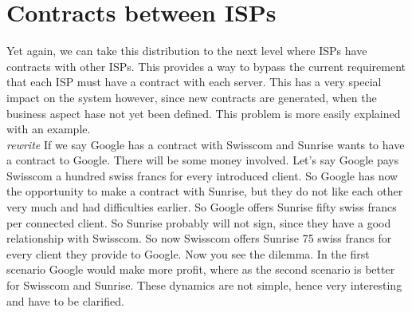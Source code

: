 \section{Contracts between ISPs}
Yet again, we can take this distribution to the next level where ISPs have contracts with other ISPs. This provides a way to bypass the current requirement that each ISP must have a contract with each server. This has a very special impact on the system however, since new contracts are generated, when the business aspect hase not yet been defined. This problem is more easily explained with an example.\\
\textit{rewrite}
If we say Google has a contract with Swisscom and Sunrise wants to have a contract to Google. There will be some money involved. Let's say Google pays Swisscom a hundred swiss francs for every introduced client. So Google has now the opportunity to make a contract with Sunrise, but they do not like each other very much and had difficulties earlier. So Google offers Sunrise fifty swiss francs per connected client. So Sunrise probably will not sign, since they have a good relationship with Swisscom. So now Swisscom offers Sunrise 75 swiss francs for every client they provide to Google. Now you see the dilemma. In the first scenario Google would make more profit, where as the second scenario is better for Swisscom and Sunrise. These dynamics are not simple, hence very interesting and have to be clarified. 

